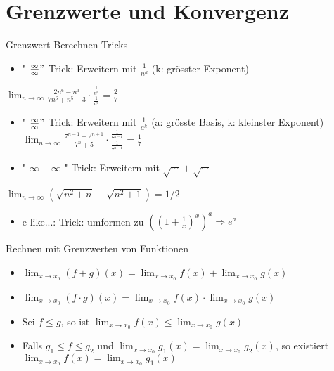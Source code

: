 \section{Grenzwerte und Konvergenz}



\begin{KR}{Grenzwert Berechnen Tricks}
  \begin{itemize}
    \item " $\frac{\infty}{\infty} "$ Trick: Erweitern mit $\frac{1}{n^{k}}$ (k: grösster Exponent)
  \end{itemize}
  
  $\lim _{n \rightarrow \infty} \frac{2 n^{6}-n^{3}}{7 n^{6}+n^{5}-3} \cdot \frac{\frac{1}{n^{6}}}{\frac{1}{n^{6}}}=\frac{2}{7}$
  
  \begin{itemize}
    \item " $\frac{\infty}{\infty} "$ Trick: Erweitern mit $\frac{1}{a^{k}}$ (a: grösste Basis, k: kleinster Exponent) $\lim _{n \rightarrow \infty} \frac{7^{n-1}+2^{n+1}}{7^{n}+5} \cdot \frac{\frac{1}{7^{n-1}}}{\frac{1}{7^{n-1}}}=\frac{1}{7}$
    \item " $\infty-\infty$ " Trick: Erweitern mit $\sqrt{\cdots}+\sqrt{\cdots}$
  \end{itemize}
  
  $\lim _{n \rightarrow \infty}\left(\sqrt{n^{2}+n}-\sqrt{n^{2}+1}\right)=1 / 2$
  
  \begin{itemize}
    \item e-like...: Trick: umformen zu $\left(\left(1+\frac{1}{x}\right)^{x}\right)^{a} \Rightarrow e^{a}$
  \end{itemize}
\end{KR}

\begin{concept}{Rechnen mit Grenzwerten von Funktionen}
    \begin{itemize}
        \item $\lim_{x \to x_0} (f + g)(x) = \lim_{x \to x_0} f(x) + \lim_{x \to x_0} g(x)$
        \item $\lim_{x \to x_0} (f \cdot g)(x) = \lim_{x \to x_0} f(x) \cdot \lim_{x \to x_0} g(x)$
        \item Sei $f \leq g$, so ist $\lim_{x \to x_0} f(x) \leq \lim_{x \to x_0} g(x)$
        \item Falls $g_1 \leq f \leq g_2$ und $\lim_{x \to x_0} g_1(x) = \lim_{x \to x_0} g_2(x)$, so existiert $\lim_{x \to x_0} f(x) = \lim_{x \to x_0} g_1(x)$
    \end{itemize}
\end{concept}


